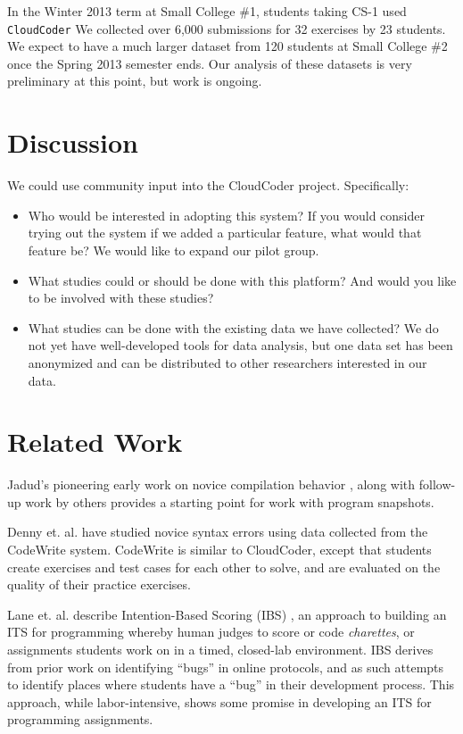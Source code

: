 \documentclass{sig-alternate}
\begin{document}
In the Winter 2013 term at Small College \#1, students taking CS-1 used {\tt CloudCoder}
%
% 
We collected over 6,000 submissions
for 32 exercises by 23 students.  We expect to have a much larger
dataset from 120 students at 
Small College \#2
once the Spring 2013 semester ends.  Our analysis of these datasets is
very preliminary at this point, but work is ongoing.


\section{Discussion}

We could use community input into the CloudCoder project.  Specifically:

\begin{itemize}
\item Who would be interested in adopting this system?  If you would
  consider trying out the system if we added a particular feature,
  what would that feature be?  We would like
  to expand our pilot group.
\item What studies could or should be done with this platform?  And
  would you like to be involved with these studies?
\item What studies can be done with the existing data we have
  collected?  We do not yet have well-developed tools for data
  analysis, but one data set has been anonymized and can be
  distributed to other researchers interested in our data.
\end{itemize}

\section{Related Work}

Jadud's pioneering early work on novice compilation behavior
\cite{Jadud:2006:MTE:1151588.1151600}, along with follow-up work by
others \cite{Norris:2008:CCQ:1384271.1384284} provides a starting point for
work with program snapshots.

Denny et. al. have studied novice syntax errors
\cite{Denny:2012:SEE:2325296.2325318} using data collected from the CodeWrite system.
CodeWrite is similar to CloudCoder, except that students create
exercises and test cases for each other to solve, and are evaluated on
the quality of their practice exercises.

Lane et. al. describe Intention-Based Scoring (IBS) \cite{Lane:2005:ISA:1047344.1047471},
an approach to building an ITS for programming whereby human
judges to score or code {\em charettes}, or assignments students work on in a
timed, closed-lab environment.  IBS derives from prior work on
identifying ``bugs'' in online protocols, and as such attempts to
identify places where students have a ``bug'' in their development
process.  This approach, while labor-intensive, shows some promise in
developing an ITS for programming assignments.
\end{document}
